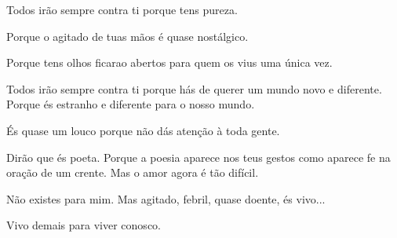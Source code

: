\begin{poem}
\begin{stanza}
Todos irão sempre contra ti\verseline
porque tens pureza.
\end{stanza}
\begin{stanza}
Porque o agitado de tuas mãos\verseline
é quase nostálgico.
\end{stanza}
\begin{stanza}
Porque tens olhos\verseline
ficarao abertos\verseline
para quem os vius\verseline
uma única vez.
\end{stanza}
\begin{stanza}
Todos irão sempre contra ti\verseline
porque hás de querer\verseline
um mundo novo e diferente.\verseline
Porque és estranho\verseline
e diferente para o nosso mundo.
\end{stanza}
\begin{stanza}
És quase um louco\verseline
porque não dás atenção\verseline
à toda gente.
\end{stanza}
\begin{stanza}
Dirão que és poeta.\verseline
Porque a poesia aparece nos teus gestos\verseline
como aparece fe na oração de um crente.\verseline
Mas o amor agora é tão difícil.
\end{stanza}
\begin{stanza}
Não existes para mim.\verseline
Mas agitado, febril,\verseline
quase doente, és vivo...
\end{stanza}
\begin{stanza}
Vivo demais para viver conosco.
\end{stanza}
\end{poem}